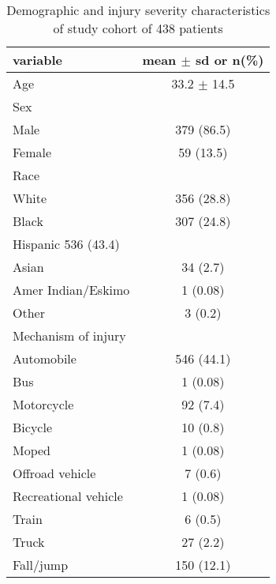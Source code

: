 \documentclass{article}
\begin{document}
\begin{table}[H]
\caption{Demographic and injury severity characteristics of study cohort of 438 patients}
\begin{center}
\begin{tabular}{lc}
\hline
variable & mean $\pm$ sd or n(\%)\\
\hline
Age & 33.2 $\pm$ 14.5\\
Sex &\\
\hspace{1 em} Male & 379 (86.5)\\
\hspace{1 em} Female &59 (13.5)\\
Race &\\
\hspace{1 em} White & 356 (28.8)\\
\hspace{1 em} Black & 307 (24.8)\\
\hspace{1 em} Hispanic 536 (43.4)&\\
\hspace{1 em} Asian & 34 (2.7)\\
\hspace{1 em} Amer Indian/Eskimo & 1 (0.08)\\
\hspace{1 em} Other & 3 (0.2)\\
Mechanism of injury &\\
\hspace{1 em} Automobile & 546 (44.1)\\
\hspace{1 em} Bus & 1 (0.08)\\
\hspace{1 em} Motorcycle & 92 (7.4)\\
\hspace{1 em} Bicycle & 10 (0.8)\\
\hspace{1 em} Moped & 1 (0.08)\\
\hspace{1 em} Offroad vehicle & 7 (0.6)\\
\hspace{1 em} Recreational vehicle & 1 (0.08)\\
\hspace{1 em} Train & 6 (0.5)\\
\hspace{1 em} Truck & 27 (2.2)\\
\hspace{1 em} Fall/jump & 150 (12.1)\\

\end{tabular}
\end{center}
\end{table}
\end{document}
